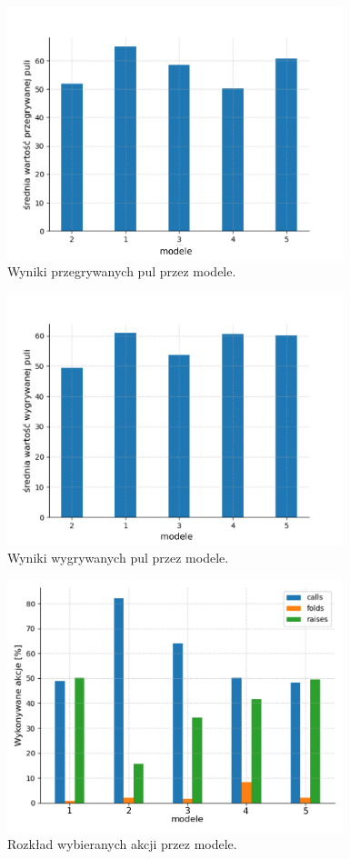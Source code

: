 \documentclass[12pt,oneside,a4paper]{report}
\begin{document}
\begin{figure}[!ht]
  \centering
  \includegraphics[width=0.87\textwidth]{./img/mecze_ps.pdf}
  \caption{Wyniki przegrywanych pul przez modele.}
\end{figure}


\begin{figure}[!ht]
  \centering
  \includegraphics[width=0.87\textwidth]{./img/mecze_pw.pdf}
  \caption{Wyniki wygrywanych pul przez modele.}
\end{figure}


\begin{figure}[!ht]
  \centering
  \includegraphics[width=0.87\textwidth]{./img/akcje.pdf}
  \caption{Rozkład wybieranych akcji przez modele.}
\end{figure}
\end{document}
